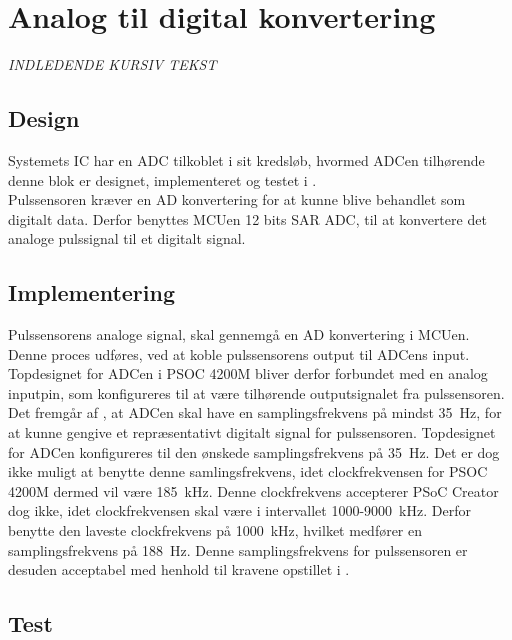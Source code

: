 \section{Analog til digital konvertering}
\textit{INDLEDENDE KURSIV TEKST}

\subsection{Design}
Systemets IC har en ADC tilkoblet i sit kredsløb, hvormed ADCen tilhørende denne blok er designet, implementeret og testet i .\\
Pulssensoren kræver en AD konvertering for at kunne blive behandlet som digitalt data. Derfor benyttes MCUen 12 bits SAR ADC, til at konvertere det analoge pulssignal til et digitalt signal. 


\subsection{Implementering}
Pulssensorens analoge signal, skal gennemgå en AD konvertering i MCUen. Denne proces udføres, ved at koble pulssensorens output til ADCens input. Topdesignet for ADCen i PSOC 4200M bliver derfor forbundet med en analog inputpin, som konfigureres til at være tilhørende outputsignalet fra pulssensoren. \\
Det fremgår af , at ADCen skal have en samplingsfrekvens på mindst 35~Hz, for at kunne gengive et repræsentativt digitalt signal for pulssensoren. Topdesignet for ADCen konfigureres til den ønskede samplingsfrekvens på 35~Hz. Det er dog ikke muligt at benytte denne samlingsfrekvens, idet clockfrekvensen for PSOC 4200M dermed vil være 185~kHz. Denne clockfrekvens accepterer PSoC Creator dog ikke, idet clockfrekvensen skal være i intervallet 1000-9000~kHz. Derfor benytte den laveste clockfrekvens på 1000~kHz, hvilket medfører en samplingsfrekvens på 188~Hz. Denne samplingsfrekvens for pulssensoren er desuden acceptabel med henhold til kravene opstillet i . 


\subsection{Test}

